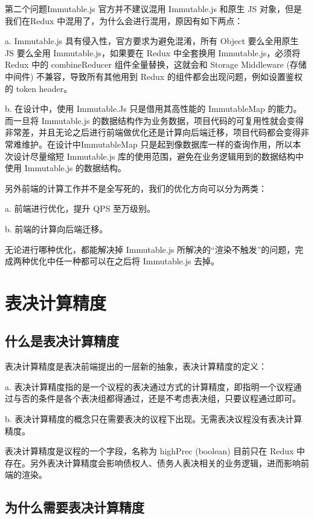   第二个问题Immutable.js 官方并不建议混用 Immutable.js 和原生 JS 对象，但是我们在Redux 中混用了，为什么会进行混用，原因有如下两点：

  \quad{}a. Immutable.js 具有侵入性，官方要求为避免混淆，所有 Object 要么全用原生 JS 要么全用 Immutable.js，如果要在 Redux 中全套换用 Immutable.js，必须将 Redux 中的 combineReducer 组件全量替换，这就会和 Storage Middleware (存储中间件) 不兼容，导致所有其他用到 Redux 的组件都会出现问题，例如设置鉴权的 token header。


  \quad{}b. 在设计中，使用 Immutable.Js 只是借用其高性能的 ImmutableMap 的能力。而一旦将 Immutable.js 的数据结构作为业务数据，项目代码的可复用性就会变得非常差，并且无论之后进行前端做优化还是计算向后端迁移，项目代码都会变得非常难维护。在设计中ImmutableMap 只是起到像数据库一样的查询作用，所以本次设计尽量缩短 Immutable.js 库的使用范围，避免在业务逻辑用到的数据结构中使用 Immutable.js 的数据结构。

  另外前端的计算工作并不是全写死的，我们的优化方向可以分为两类：

  \quad{}a. 前端进行优化，提升 QPS 至万级别。

  \quad{}b. 前端的计算向后端迁移。

  无论进行哪种优化，都能解决掉 Immutable.js 所解决的“渲染不触发”的问题，完成两种优化中任一种都可以在之后将 Immutable.js 去掉。

  \section{表决计算精度}
  \subsection{什么是表决计算精度}
  表决计算精度是表决前端提出的一层新的抽象，表决计算精度的定义：

  \quad{}a. 表决计算精度指的是一个议程的表决通过方式的计算精度，即指明一个议程通过与否的条件是各个表决组都得通过，还是不考虑表决组，只要议程通过即可。


  \quad{}b. 表决计算精度的概念只在需要表决的议程下出现。无需表决议程没有表决计算精度。

  表决计算精度是议程的一个字段，名称为 highPrec (boolean) 目前只在 Redux 中存在。另外表决计算精度会影响债权人、债务人表决相关的业务逻辑，进而影响前端的渲染。

  \subsection{为什么需要表决计算精度}

